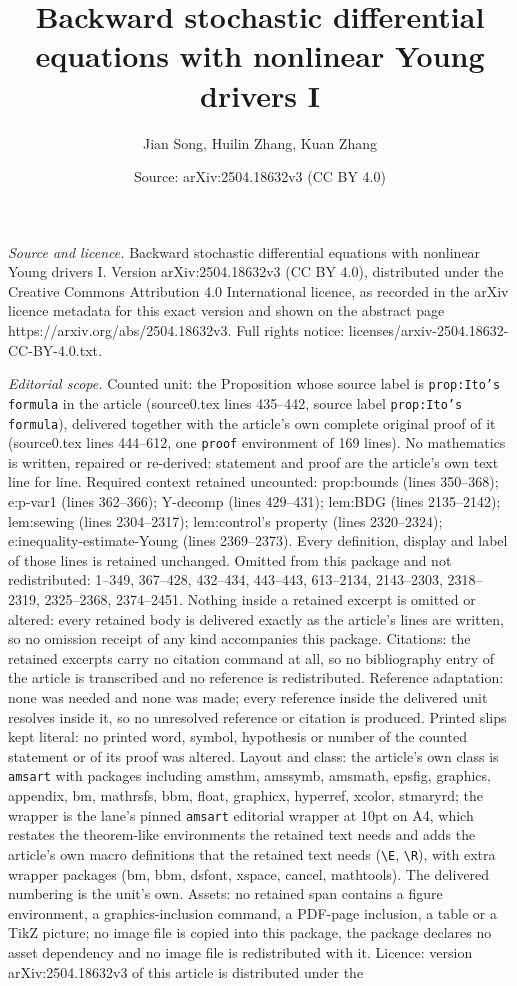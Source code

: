 \documentclass[10pt,a4paper]{amsart}
\title[Backward stochastic differential equations with nonlinear Yo]{Backward stochastic differential equations with nonlinear Young drivers I}
\author{Jian Song, Huilin Zhang, Kuan Zhang}
\date{Source: arXiv:2504.18632v3 (CC BY 4.0)}
\begin{document}
\maketitle

\noindent\emph{Source and licence.} Backward stochastic differential equations with nonlinear Young drivers I. Version arXiv:2504.18632v3 (CC BY 4.0), distributed under the Creative Commons Attribution 4.0 International licence, as recorded in the arXiv licence metadata for this exact version and shown on the abstract page https://arxiv.org/abs/2504.18632v3. Full rights notice: licenses/arxiv-2504.18632-CC-BY-4.0.txt.\par\smallskip

\noindent\textit{Editorial scope.} Counted unit: the Proposition whose source label is \texttt{prop:Ito's formula} in the article (source0.tex lines 435--442, source label \texttt{prop:Ito's formula}), delivered together with the article's own complete original proof of it (source0.tex lines 444--612, one \texttt{proof} environment of 169 lines). No mathematics is written, repaired or re-derived: statement and proof are the article's own text line for line. Required context retained uncounted: prop:bounds (lines 350--368); e:p-var1 (lines 362--366); Y-decomp (lines 429--431); lem:BDG (lines 2135--2142); lem:sewing (lines 2304--2317); lem:control's property (lines 2320--2324); e:inequality-estimate-Young (lines 2369--2373). Every definition, display and label of those lines is retained unchanged. Omitted from this package and not redistributed: 1--349, 367--428, 432--434, 443--443, 613--2134, 2143--2303, 2318--2319, 2325--2368, 2374--2451. Nothing inside a retained excerpt is omitted or altered: every retained body is delivered exactly as the article's lines are written, so no omission receipt of any kind accompanies this package. Citations: the retained excerpts carry no citation command at all, so no bibliography entry of the article is transcribed and no reference is redistributed. Reference adaptation: none was needed and none was made; every reference inside the delivered unit resolves inside it, so no unresolved reference or citation is produced. Printed slips kept literal: no printed word, symbol, hypothesis or number of the counted statement or of its proof was altered. Layout and class: the article's own class is \texttt{amsart} with packages including amsthm, amssymb, amsmath, epsfig, graphics, appendix, bm, mathrsfs, bbm, float, graphicx, hyperref, xcolor, stmaryrd; the wrapper is the lane's pinned \texttt{amsart} editorial wrapper at 10pt on A4, which restates the theorem-like environments the retained text needs and adds the article's own macro definitions that the retained text needs (\texttt{\textbackslash E}, \texttt{\textbackslash R}), with extra wrapper packages (bm, bbm, dsfont, xspace, cancel, mathtools). The delivered numbering is the unit's own. Assets: no retained span contains a figure environment, a graphics-inclusion command, a PDF-page inclusion, a table or a TikZ picture; no image file is copied into this package, the package declares no asset dependency and no image file is redistributed with it. Licence: version arXiv:2504.18632v3 of this article is distributed under the 
\end{document}
